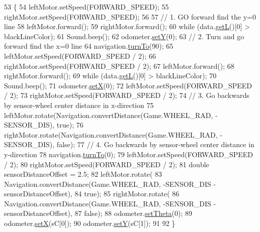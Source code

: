 \begin{DoxyCode}
53                                  \{
54     leftMotor.setSpeed(FORWARD\_SPEED);
55     rightMotor.setSpeed(FORWARD\_SPEED);
56 
57     \textcolor{comment}{// 1. GO forward find the y=0 line}
58     leftMotor.forward();
59     rightMotor.forward();
60     \textcolor{keywordflow}{while} (data.\hyperlink{classca_1_1mcgill_1_1ecse211_1_1threads_1_1_sensor_data_a39eec50582f0e4bcff8a4669c48e1609}{getL}()[0] > blackLineColor);
61     Sound.beep();
62     odometer.\hyperlink{classca_1_1mcgill_1_1ecse211_1_1odometer_1_1_odometer_data_a82986438cd462e66520bc62bb4bd2b75}{setY}(0);
63     \textcolor{comment}{// 2. Turn and go forward find the x=0 line}
64     navigation.\hyperlink{classca_1_1mcgill_1_1ecse211_1_1project_1_1_navigation_a3bbe0645f2b3b3d0986b4a707fb5a00c}{turnTo}(90);
65     leftMotor.setSpeed(FORWARD\_SPEED / 2);
66     rightMotor.setSpeed(FORWARD\_SPEED / 2);
67     leftMotor.forward();
68     rightMotor.forward();
69     \textcolor{keywordflow}{while} (data.\hyperlink{classca_1_1mcgill_1_1ecse211_1_1threads_1_1_sensor_data_a39eec50582f0e4bcff8a4669c48e1609}{getL}()[0] > blackLineColor);
70     Sound.beep();
71     odometer.\hyperlink{classca_1_1mcgill_1_1ecse211_1_1odometer_1_1_odometer_data_a2911d7215e47f3064defe016b46bfeef}{setX}(0);
72     leftMotor.setSpeed(FORWARD\_SPEED / 2);
73     rightMotor.setSpeed(FORWARD\_SPEED / 2);
74     \textcolor{comment}{// 3. Go backwards by sensor-wheel center distance in x-direction}
75     leftMotor.rotate(Navigation.convertDistance(Game.WHEEL\_RAD, -SENSOR\_DIS), \textcolor{keyword}{true});
76     rightMotor.rotate(Navigation.convertDistance(Game.WHEEL\_RAD, -SENSOR\_DIS), \textcolor{keyword}{false});
77     \textcolor{comment}{// 4. Go backwards by sensor-wheel center distance in y-direction}
78     navigation.\hyperlink{classca_1_1mcgill_1_1ecse211_1_1project_1_1_navigation_a3bbe0645f2b3b3d0986b4a707fb5a00c}{turnTo}(0);
79     leftMotor.setSpeed(FORWARD\_SPEED / 2);
80     rightMotor.setSpeed(FORWARD\_SPEED / 2);
81     \textcolor{keywordtype}{double} sensorDistanceOffset = 2.5;
82     leftMotor.rotate(
83         Navigation.convertDistance(Game.WHEEL\_RAD, -SENSOR\_DIS - sensorDistanceOffset),
84         \textcolor{keyword}{true});
85     rightMotor.rotate(
86         Navigation.convertDistance(Game.WHEEL\_RAD, -SENSOR\_DIS - sensorDistanceOffset),
87         \textcolor{keyword}{false});
88     odometer.\hyperlink{classca_1_1mcgill_1_1ecse211_1_1odometer_1_1_odometer_data_a419b8f07c2c5374411c8e62298e9a402}{setTheta}(0);
89     odometer.\hyperlink{classca_1_1mcgill_1_1ecse211_1_1odometer_1_1_odometer_data_a2911d7215e47f3064defe016b46bfeef}{setX}(sC[0]);
90     odometer.\hyperlink{classca_1_1mcgill_1_1ecse211_1_1odometer_1_1_odometer_data_a82986438cd462e66520bc62bb4bd2b75}{setY}(sC[1]);
91 
92   \}
\end{DoxyCode}
